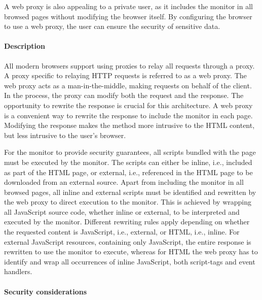 \documentclass{llncs}
\newcommand{\todo}[1]{\colorbox{red}{\textcolor{white}{\sffamily\bfseries\scriptsize TODO}} \textcolor{red}{#1} \textcolor{red}{$\blacktriangleleft$}}
\begin{document}
A web proxy is also appealing to a private user, as it includes the monitor in all browsed pages without modifying 
the browser itself. By configuring the browser to use a web proxy, the user can ensure the security 
of sensitive data.

\paragraph{Description}
All modern browsers support using proxies to relay all requests through a proxy.
A proxy specific to relaying HTTP requests is referred to as a web proxy.
The web proxy acts as a man-in-the-middle, making 
requests on behalf of the client. In the process, the proxy can
modify both the request and the response. 
The opportunity to rewrite the response is crucial for this architecture.
A web proxy is a convenient way to rewrite the response to include 
the monitor in each page. Modifying the response makes the method more 
intrusive to the HTML content, but less intrusive to the user's browser. 

For the monitor to provide security guarantees, all scripts bundled with 
the page must be executed by the monitor. The scripts can either be inline, 
i.e., included as part of the HTML page, or external, i.e., referenced in the 
HTML page to be downloaded from an external source.
Apart from including the monitor in all browsed pages, all inline and external 
scripts must be identified and rewritten by the web proxy to direct execution to the monitor.
This is achieved by wrapping all JavaScript source code, whether inline or 
external, to be interpreted and executed by the monitor.
Different rewriting rules apply depending on whether the 
requested content is JavaScript, i.e., external, or HTML, i.e., inline. 
For external 
JavaScript resources, containing only JavaScript, the entire response is rewritten to use the monitor to execute, whereas 
for HTML the web proxy has to identify and wrap all occurrences of inline 
JavaScript, both script-tags and event handlers.


\paragraph{Security considerations}
\end{document}
